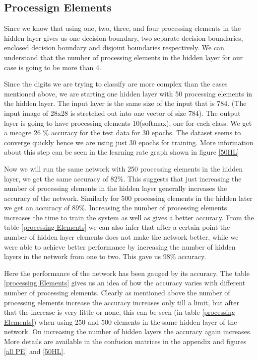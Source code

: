 \documentclass[conference]{IEEEtran}
\begin{document}
\subsection{Processign Elements}
Since we know that using one, two, three, and four processing elements in the hidden layer gives us one decision boundary, two separate decision boundaries, enclosed decision boundary and disjoint boundaries respectively. We can understand that the number of processing elements in the hidden layer for our case is going to be more than 4. 

Since the digits we are trying to classify are more complex than the cases mentioned above, we are starting one hidden layer with 50 processing elements in the hidden layer. The input layer is the same size of the input that is 784. (The input image of 28x28 is stretched out into one vector of size 784). The output layer is going to have processing elements 10(softmax), one for each class. We get a meagre 26 \% accuracy for the test data for 30 epochs. The dataset seems to converge quickly hence we are using just 30 epochs for training. More information about this step can be seen in the learning rate graph shown in figure \ref{50HL}

Now we will run the same network with 250 processing elements in the hidden layer, we get the same accuracy of 82\%. This suggests that just increasing the number of processing elements in the hidden layer generally increases the accuracy of the network. Similarly for 500 processing elements in the hidden later we get an accuracy of 89\%. Increasing the number of processing elements increases the time to train the system as well as gives a better accuracy. From the table \ref{processing Elements} we can also infer that after a certain point the number of hidden layer elements does not make the network better, while we were able to achieve better performance by increasing the number of hidden layers in the network from one to two. This gave us 98\% accuracy. 

Here the performance of the network has been gauged by its accuracy. The table \ref{processing Elements} gives us an idea of how the accuracy varies with different number of processing elements. Clearly as mentioned above the number of processing elements increase the accuracy increases only till a limit, but after that the increase is very little or none, this can be seen (in table \ref{processing Elements}) when using 250 and 500 elements in the same hidden layer of the network. On increasing the number of hidden layers the accuracy again increases. More details are available in the confusion matrices in the appendix and  figures \ref{all PE} and \ref{50HL}.
\end{document}
